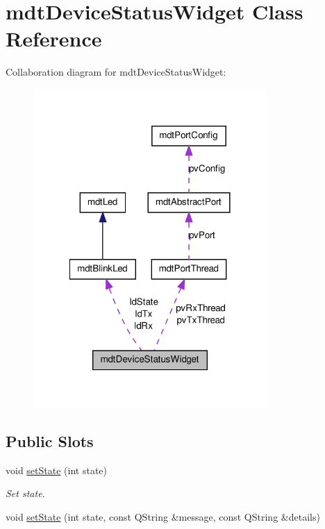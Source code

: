 \hypertarget{classmdt_device_status_widget}{
\section{mdtDeviceStatusWidget Class Reference}
\label{classmdt_device_status_widget}
}


Collaboration diagram for mdtDeviceStatusWidget:
\nopagebreak
\begin{figure}[H]
\begin{center}
\leavevmode
\includegraphics[width=252pt]{classmdt_device_status_widget__coll__graph}
\end{center}
\end{figure}
\subsection*{Public Slots}
\begin{DoxyCompactItemize}
\item 
void \hyperlink{classmdt_device_status_widget_aff26f53555fcaf57d79d70c712e24928}{setState} (int state)
\begin{DoxyCompactList}\small\item\em Set state. \end{DoxyCompactList}\item 
void \hyperlink{classmdt_device_status_widget_af9d0bf5fb74e55bcdab7c8bd86ddfa33}{setState} (int state, const QString \&message, const QString \&details)
\end{DoxyCompactItemize}
